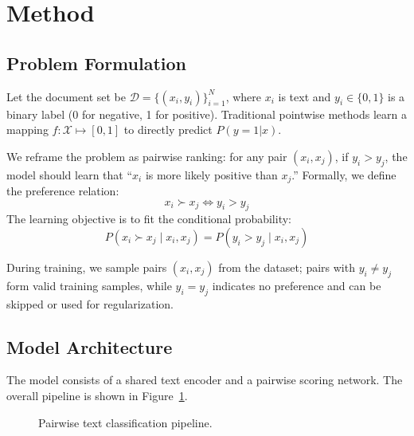 \documentclass[11pt, a4paper]{article}
\begin{document}
\section{Method}

\subsection{Problem Formulation}

Let the document set be $\mathcal{D} = \{(x_i, y_i)\}_{i=1}^N$, where $x_i$ is text and $y_i \in \{0, 1\}$ is a binary label (0 for negative, 1 for positive). Traditional pointwise methods learn a mapping $f: \mathcal{X} \mapsto [0,1]$ to directly predict $P(y=1|x)$.

We reframe the problem as pairwise ranking: for any pair $(x_i, x_j)$, if $y_i > y_j$, the model should learn that ``$x_i$ is more likely positive than $x_j$.'' Formally, we define the preference relation:
\begin{equation}
x_i \succ x_j \iff y_i > y_j
\end{equation}
The learning objective is to fit the conditional probability:
\begin{equation}
P(x_i \succ x_j \mid x_i, x_j) = P(y_i > y_j \mid x_i, x_j)
\end{equation}

During training, we sample pairs $(x_i, x_j)$ from the dataset; pairs with $y_i \neq y_j$ form valid training samples, while $y_i = y_j$ indicates no preference and can be skipped or used for regularization.

\subsection{Model Architecture}

The model consists of a shared text encoder and a pairwise scoring network. The overall pipeline is shown in Figure~\ref{fig:model}.

\begin{figure}[htbp]
\centering
{}
\caption{Pairwise text classification pipeline.}
\label{fig:model}
\end{figure}
\end{document}

